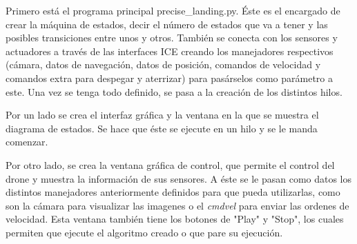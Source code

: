 \hspace{1 cm} Primero est\'a el programa principal precise_landing.py. \'Este es el encargado de crear la m\'aquina de estados, decir el n\'umero de estados que va a tener y las posibles transiciones entre unos y otros. Tambi\'en se conecta con los sensores y actuadores a trav\'es de las interfaces ICE creando los manejadores respectivos (c\'amara, datos de navegaci\'on, datos de posici\'on, comandos de velocidad y comandos extra para despegar y aterrizar) para pas\'arselos como par\'ametro a este. Una vez se tenga todo definido, se pasa a la creaci\'on de los distintos hilos.

\hspace{1 cm} Por un lado se crea el interfaz gr\'afica y la ventana en la que se muestra el diagrama de estados. Se hace que \'este se ejecute en un hilo y se le manda comenzar.

\hspace{1 cm} Por otro lado, se crea la ventana gr\'afica de control, que permite el control del drone y muestra la informaci\'on de sus sensores. A \'este se le pasan como datos los distintos manejadores anteriormente definidos para que pueda utilizarlas, como son la c\'amara para visualizar las imagenes o el \textit{cmdvel} para enviar las ordenes de velocidad. Esta ventana tambi\'en tiene los botones de "Play" y "Stop", los cuales permiten que ejecute el algoritmo creado o que pare su ejecuci\'on.

